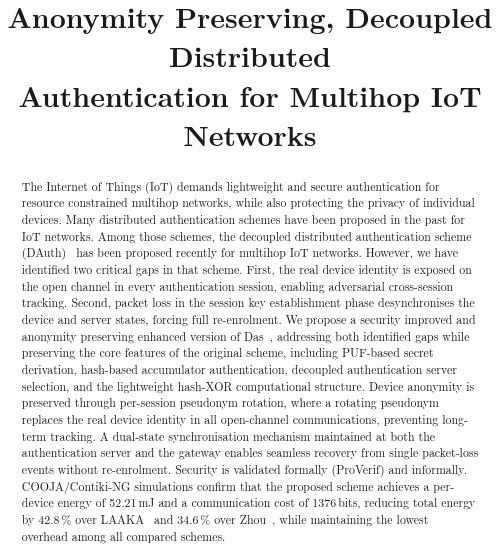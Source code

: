 \documentclass[conference]{IEEEtran}
\begin{document}
\title{Anonymity Preserving, Decoupled Distributed\\Authentication for Multihop IoT Networks}

\author{
  
}

\maketitle

\begin{abstract}
The Internet of Things (IoT) demands lightweight and secure authentication
for resource constrained multihop networks, while also protecting the
privacy of individual devices.  Many distributed authentication schemes have
been proposed in the past for IoT networks. Among those schemes, the decoupled
distributed authentication scheme (DAuth)~\cite{das2026comsnets} has been
proposed recently for multihop IoT networks. However, we have identified
two critical gaps in that scheme. First, the real device identity is exposed on the open
channel in every authentication session, enabling adversarial cross-session
tracking. Second, packet loss in the session key establishment phase desynchronises
the device and server states, forcing full re-enrolment.  We propose a security improved and anonymity preserving enhanced version of Das~\cite{das2026comsnets},
addressing both identified gaps while preserving the core features of the
original scheme, including PUF-based secret derivation, hash-based accumulator
authentication, decoupled authentication server selection, and the
lightweight hash-XOR computational structure.  Device anonymity is preserved through per-session
pseudonym rotation, where a rotating pseudonym replaces the real device identity
in all open-channel communications, preventing long-term tracking.  A
dual-state synchronisation mechanism maintained at both the authentication
server and the gateway enables seamless recovery from single packet-loss
events without re-enrolment.  Security is validated formally (ProVerif) and informally.
COOJA/Contiki-NG simulations confirm that the proposed scheme achieves a
per-device energy of 52.21\,mJ and a communication cost of 1376\,bits,
reducing total energy by 42.8\,\% over LAAKA~\cite{ali2024laaka} and 34.6\,\% over Zhou~\cite{zhou2024auth}, while
maintaining the lowest overhead among all compared schemes.
\end{abstract}
\end{document}
